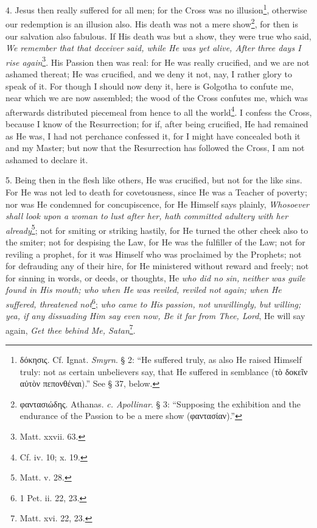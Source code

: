 4. Jesus then really suffered for all men; for the Cross was no illusion\footnote{\textgreek{δόκησις}. Cf. Ignat. \emph{Smyrn}. § 2: “He suffered truly, as also He raised Himself truly: not as certain unbelievers say, that He suffered in semblance (\textgreek{τὸ δοκεῖν αὐτὸν πεπονθέναι}).” See § 37, below.}, otherwise our redemption is an illusion also. His death was not a mere show\footnote{\textgreek{φαντασιώδης}. Athanas. \emph{c. Apollinar}. § 3: “Supposing the exhibition and the endurance of the Passion to be a mere show (\textgreek{φαντασίαν}).”}, for then is our salvation also fabulous. If His death was but a show, they were true who said, \emph{We remember that that deceiver said, while He was yet alive, After three days I rise again}\footnote{Matt. xxvii. 63.}. His Passion then was real: for He was really crucified, and we are not ashamed thereat; He was crucified, and we deny it not, nay, I rather glory to speak of it. For though I should now deny it, here is Golgotha to confute me, near which we are now assembled; the wood of the Cross confutes me, which was afterwards distributed piecemeal from hence to all the world\footnote{Cf. iv. 10; x. 19.}. I confess the Cross, because I know of the Resurrection; for if, after being crucified, He had remained as He was, I had not perchance confessed it, for I might have concealed both it and my Master; but now that the Resurrection has followed the Cross, I am not ashamed to declare it.

5. Being then in the flesh like others, He was crucified, but not for the like sins. For He was not led to death for covetousness, since He was a Teacher of poverty; nor was He condemned for concupiscence, for He Himself says plainly, \emph{Whosoever shall look upon a woman to lust after her, hath committed adultery with her already}\footnote{Matt. v. 28.}; not for smiting or striking hastily, for He turned the other cheek also to the smiter; not for despising the Law, for He was the fulfiller of the Law; not for reviling a prophet, for it was Himself who was proclaimed by the Prophets; not for defrauding any of their hire, for He ministered without reward and freely; not for sinning in words, or deeds, or thoughts, He \emph{who did no sin, neither was guile found in His mouth; who when He was reviled, reviled not again; when He suffered, threatened not}\footnote{1 Pet. ii. 22, 23.}; \emph{who came to His passion, not unwillingly, but willing; yea, if any dissuading Him say even now, Be it far from Thee, Lord}, He will say again, \emph{Get thee behind Me, Satan}\footnote{Matt. xvi. 22, 23.}.

